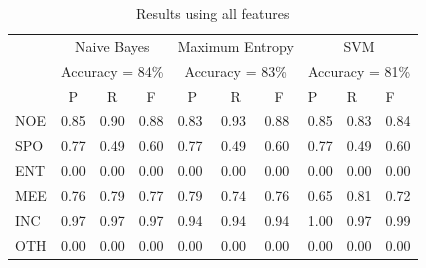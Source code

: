 \documentclass[
10pt, %
a4paper, %
oneside, %
headinclude,footinclude, %
BCOR5mm, %
]{scrartcl}
\begin{document}
\begin{table}[h]
 \centering
\caption[Results using all features]{Results using all features }
\begin{tabular}{l|l|l|l|l|l|l|l|l|l|}
\cline{2-10}
                          & \multicolumn{3}{c|}{Naive Bayes}                                         & \multicolumn{3}{c|}{Maximum Entropy}                                     & \multicolumn{3}{c|}{SVM}             \\ \cline{2-10} 
                          & \multicolumn{3}{c|}{Accuracy = 84\%}                                     & \multicolumn{3}{c|}{Accuracy = 83\%}                                     & \multicolumn{3}{c|}{Accuracy = 81\%} \\ \cline{2-10} 
                          & \multicolumn{1}{c|}{P} & \multicolumn{1}{c|}{R} & \multicolumn{1}{c|}{F} & \multicolumn{1}{c|}{P} & \multicolumn{1}{c|}{R} & \multicolumn{1}{c|}{F} & P          & R          & F          \\ \hline
\multicolumn{1}{|l|}{NOE} & 0.85                   & 0.90                   & 0.88                   & 0.83                   & 0.93                   & 0.88                   & 0.85       & 0.83       & 0.84       \\ \hline
\multicolumn{1}{|l|}{SPO} & 0.77                   & 0.49                   & 0.60                   & 0.77                   & 0.49                   & 0.60                   & 0.77       & 0.49       & 0.60       \\ \hline
\multicolumn{1}{|l|}{ENT} & 0.00                   & 0.00                   & 0.00                   & 0.00                   & 0.00                   & 0.00                   & 0.00       & 0.00       & 0.00       \\ \hline
\multicolumn{1}{|l|}{MEE} & 0.76                   & 0.79                   & 0.77                   & 0.79                   & 0.74                   & 0.76                   & 0.65       & 0.81       & 0.72       \\ \hline
\multicolumn{1}{|l|}{INC} & 0.97                   & 0.97                   & 0.97                   & 0.94                   & 0.94                   & 0.94                   & 1.00       & 0.97       & 0.99       \\ \hline
\multicolumn{1}{|l|}{OTH} & 0.00                   & 0.00                   & 0.00                   & 0.00                   & 0.00                   & 0.00                   & 0.00       & 0.00       & 0.00       \\ \hline
\end{tabular}

\end{table}
\end{document}
